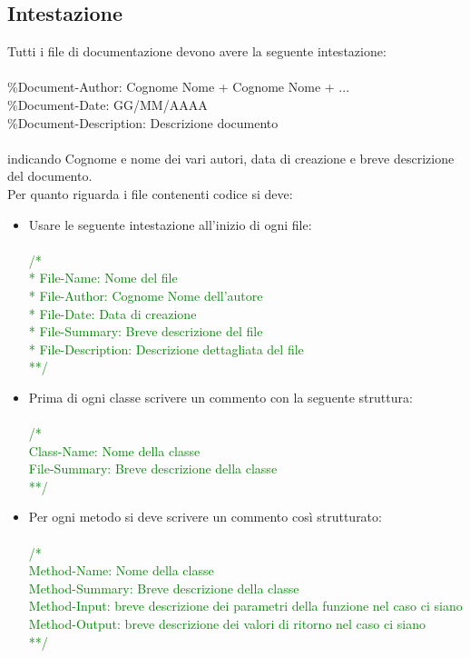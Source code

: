 \documentclass[../NormeDiProgetto.tex]{subfiles}
\begin{document}
		\subsection{Intestazione}
		Tutti i file di documentazione devono avere la seguente intestazione:\\
		\\
		\%Document-Author: Cognome Nome + Cognome Nome + ...\\
		\%Document-Date: GG/MM/AAAA\\
		\%Document-Description: Descrizione documento
		\\
		\\
		indicando Cognome e nome dei vari autori, data di creazione e breve descrizione del documento.\\
		Per quanto riguarda i file contenenti codice si deve:
		\begin{itemize}
			\item Usare le seguente intestazione all'inizio di ogni file:\\
			\textcolor{green}{	\\/*\\
				* File-Name: Nome del file\\
				* File-Author: Cognome Nome dell’autore\\
				* File-Date: Data di creazione\\
				* File-Summary: Breve descrizione del file\\
				* File-Description: Descrizione dettagliata del file\\
				**/}
			\item Prima di ogni classe scrivere un commento con la seguente struttura:\\
			\textcolor{green}{	\\/*\\
				Class-Name: Nome della classe\\
				File-Summary: Breve descrizione della classe\\
				**/}
			\item Per ogni metodo si deve scrivere un commento così strutturato:\\
			\textcolor{green}{	\\/*\\
				Method-Name: Nome della classe\\
				Method-Summary: Breve descrizione della classe\\
				Method-Input: breve descrizione dei parametri della funzione nel caso ci siano\\
				Method-Output: breve descrizione dei valori di ritorno nel caso ci siano\\ 
				**/ }
		\end{itemize}
\end{document}

